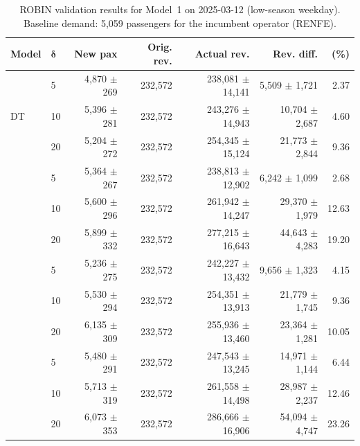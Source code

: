 \begin{table}[!h]
    \centering
    \caption{ROBIN validation results for Model~1 on 2025-03-12 (low-season weekday). Baseline demand: 5,059 passengers for the incumbent operator (RENFE).}
    \label{tab:model1_validation_2025_03_12}
    \scriptsize
    \setlength{\tabcolsep}{3pt}
    \begin{tabular}{llrrrrr}
        \toprule
        \textbf{Model}
        & \(\boldsymbol{\delta}\)
        & \textbf{New pax}
        & \textbf{Orig. rev.}
        & \textbf{Actual rev.}
        & \textbf{Rev. diff.}
        & \textbf{(\%)} \\
        \midrule
        \multirow{3}{*}{DT} & 5 & 4,870 $\pm$ 269 & 232,572 & 238,081 $\pm$ 14,141 & 5,509 $\pm$ 1,721 & 2.37 \\
         & 10 & 5,396 $\pm$ 281 & 232,572 & 243,276 $\pm$ 14,943 & 10,704 $\pm$ 2,687 & 4.60 \\
         & 20 & 5,204 $\pm$ 272 & 232,572 & 254,345 $\pm$ 15,124 & 21,773 $\pm$ 2,844 & 9.36 \\
        \addlinespace
        \multirow{3}{*}{RF} & 5 & 5,364 $\pm$ 267 & 232,572 & 238,813 $\pm$ 12,902 & 6,242 $\pm$ 1,099 & 2.68 \\
         & 10 & 5,600 $\pm$ 296 & 232,572 & 261,942 $\pm$ 14,247 & 29,370 $\pm$ 1,979 & 12.63 \\
         & 20 & 5,899 $\pm$ 332 & 232,572 & 277,215 $\pm$ 16,643 & 44,643 $\pm$ 4,283 & 19.20 \\
        \addlinespace
        \multirow{3}{*}{GBDT} & 5 & 5,236 $\pm$ 275 & 232,572 & 242,227 $\pm$ 13,432 & 9,656 $\pm$ 1,323 & 4.15 \\
         & 10 & 5,530 $\pm$ 294 & 232,572 & 254,351 $\pm$ 13,913 & 21,779 $\pm$ 1,745 & 9.36 \\
         & 20 & 6,135 $\pm$ 309 & 232,572 & 255,936 $\pm$ 13,460 & 23,364 $\pm$ 1,281 & 10.05 \\
        \addlinespace
        \multirow{3}{*}{FFNN} & 5 & 5,480 $\pm$ 291 & 232,572 & 247,543 $\pm$ 13,245 & 14,971 $\pm$ 1,144 & 6.44 \\
         & 10 & 5,713 $\pm$ 319 & 232,572 & 261,558 $\pm$ 14,498 & 28,987 $\pm$ 2,237 & 12.46 \\
         & 20 & 6,073 $\pm$ 353 & 232,572 & 286,666 $\pm$ 16,906 & 54,094 $\pm$ 4,747 & 23.26 \\
        \bottomrule
    \end{tabular}
\end{table}